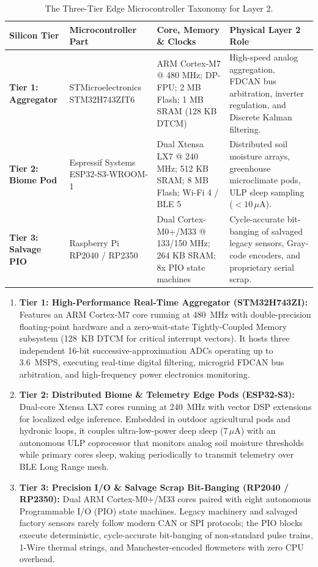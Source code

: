 \begin{table}[htbp]
\centering
\small
\setlength{\tabcolsep}{3pt}
\begin{tabular}{|p{}|p{}|p{}|p{}|}
\hline
\textbf{Silicon Tier} & \textbf{Microcontroller Part} & \textbf{Core, Memory \& Clocks} & \textbf{Physical Layer 2 Role} \\
\hline
\textbf{Tier 1: Aggregator} & STMicroelectronics STM32H743ZIT6 \parencite{st_stm32h743} & ARM Cortex-M7 @ 480 MHz; DP-FPU; 2 MB Flash; 1 MB SRAM (128 KB DTCM) & High-speed analog aggregation, FDCAN bus arbitration, inverter regulation, and Discrete Kalman filtering. \\
\hline
\textbf{Tier 2: Biome Pod} & Espressif Systems ESP32-S3-WROOM-1 & Dual Xtensa LX7 @ 240 MHz; 512 KB SRAM; 8 MB Flash; Wi-Fi 4 / BLE 5 & Distributed soil moisture arrays, greenhouse microclimate pods, ULP sleep sampling ($<10\,\mu\mathrm{A}$). \\
\hline
\textbf{Tier 3: Salvage PIO} & Raspberry Pi RP2040 / RP2350 & Dual Cortex-M0+/M33 @ 133/150 MHz; 264 KB SRAM; 8x PIO state machines & Cycle-accurate bit-banging of salvaged legacy sensors, Gray-code encoders, and proprietary serial scrap. \\
\hline
\end{tabular}
\caption{The Three-Tier Edge Microcontroller Taxonomy for Layer 2.}
\label{tab:l2-mcu-taxonomy}
\end{table}

\begin{enumerate}
    \item \textbf{Tier 1: High-Performance Real-Time Aggregator (STM32H743ZI):} Features an ARM Cortex-M7 core running at 480~MHz with double-precision floating-point hardware and a zero-wait-state Tightly-Coupled Memory subsystem (128~KB DTCM for critical interrupt vectors). It hosts three independent 16-bit successive-approximation ADCs operating up to 3.6~MSPS, executing real-time digital filtering, microgrid FDCAN bus arbitration, and high-frequency power electronics monitoring.
    \item \textbf{Tier 2: Distributed Biome \& Telemetry Edge Pods (ESP32-S3):} Dual-core Xtensa LX7 cores running at 240~MHz with vector DSP extensions for localized edge inference. Embedded in outdoor agricultural pods and hydronic loops, it couples ultra-low-power deep sleep ($7\,\mu\mathrm{A}$) with an autonomous ULP coprocessor that monitors analog soil moisture thresholds while primary cores sleep, waking periodically to transmit telemetry over BLE Long Range mesh.
    \item \textbf{Tier 3: Precision I/O \& Salvage Scrap Bit-Banging (RP2040 / RP2350):} Dual ARM Cortex-M0+/M33 cores paired with eight autonomous Programmable I/O (PIO) state machines. Legacy machinery and salvaged factory sensors rarely follow modern CAN or SPI protocols; the PIO blocks execute deterministic, cycle-accurate bit-banging of non-standard pulse trains, 1-Wire thermal strings, and Manchester-encoded flowmeters with zero CPU overhead.
\end{enumerate}

